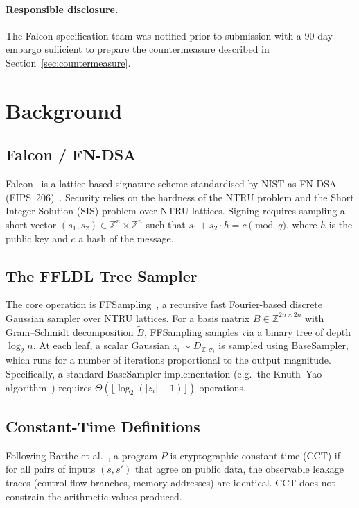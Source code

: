 \documentclass[sigconf,anonymous]{acmart}
\begin{document}
\paragraph{Responsible disclosure.}
The Falcon specification team was notified prior to submission with a 90-day
embargo sufficient to prepare the countermeasure described in
Section~\ref{sec:countermeasure}.

\section{Background}

\subsection{Falcon / FN-DSA}
Falcon~\cite{falcon2020} is a lattice-based signature scheme standardised by
NIST as FN-DSA (FIPS~206)~\cite{fips206}.  Security relies on the hardness of
the NTRU problem and the Short Integer Solution (SIS) problem over NTRU
lattices.  Signing requires sampling a short vector $(s_1,s_2)\in\mathbb{Z}^n
\times\mathbb{Z}^n$ such that $s_1 + s_2\cdot h = c \pmod{q}$, where $h$ is
the public key and $c$ a hash of the message.

\subsection{The FFLDL Tree Sampler}
The core operation is FFSampling~\cite{prest2015gaussian}, a recursive fast
Fourier-based discrete Gaussian sampler over NTRU lattices.  For a basis matrix
$B\in\mathbb{Z}^{2n\times 2n}$ with Gram--Schmidt decomposition
$\widetilde{B}$, FFSampling samples via a binary tree of depth $\log_2 n$.  At
each leaf, a scalar Gaussian $z_i\sim D_{\mathbb{Z},\sigma_i}$ is sampled using
BaseSampler, which runs for a number of iterations proportional to the output
magnitude.  Specifically, a standard BaseSampler implementation
(e.g.\ the Knuth--Yao algorithm~\cite{knuthyao}) requires
$\Theta(\lfloor\log_2(|z_i|+1)\rfloor)$ operations.

\subsection{Constant-Time Definitions}
Following Barthe et al.~\cite{barthe2014}, a program $P$ is cryptographic
constant-time (CCT) if for all pairs of inputs $(s,s')$ that agree on public
data, the observable leakage traces (control-flow branches, memory addresses)
are identical.  CCT does not constrain the arithmetic values produced.
\end{document}
